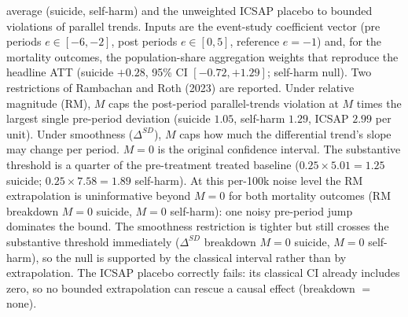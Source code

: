 \begin{table}[!htbp]
\begin{threeparttable}
\begin{tablenotes}[flushleft]
average (suicide, self-harm) and the unweighted ICSAP placebo to bounded violations of
parallel trends. Inputs are the event-study coefficient vector (pre periods $e\in[-6,-2]$,
post periods $e\in[0,5]$, reference $e=-1$) and, for the mortality outcomes, the
population-share aggregation weights that reproduce the headline ATT (suicide $+0.28$,
95\% CI $[-0.72,+1.29]$; self-harm null). Two restrictions of Rambachan and Roth (2023)
are reported. Under relative magnitude (RM), $M$ caps the post-period parallel-trends
violation at $M$ times the largest single pre-period deviation (suicide $1.05$, self-harm $1.29$, ICSAP $2.99$ per unit).
Under smoothness ($\Delta^{SD}$), $M$ caps how much the differential trend's slope may
change per period. $M=0$ is the original confidence interval.
The substantive threshold is a quarter of the pre-treatment treated baseline ($0.25\times5.01=1.25$ suicide; $0.25\times7.58=1.89$ self-harm).
At this per-100k noise level the RM extrapolation is uninformative beyond $M=0$ for both mortality outcomes (RM breakdown $M=0$ suicide, $M=0$ self-harm): one noisy pre-period jump dominates the bound.
The smoothness restriction is tighter but still crosses the substantive threshold immediately ($\Delta^{SD}$ breakdown $M=0$ suicide, $M=0$ self-harm), so the null is supported by the classical interval rather than by extrapolation.
The ICSAP placebo correctly fails: its classical CI already includes zero, so no bounded
extrapolation can rescue a causal effect (breakdown $=$ none).
\end{tablenotes}
\end{threeparttable}
\end{table}
